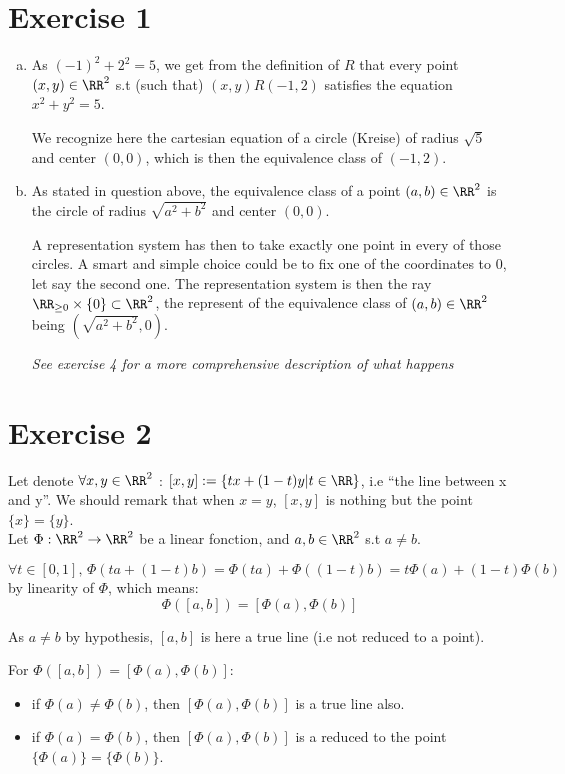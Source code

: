 \section{Exercise 1}

\begin{enumerate}[a)]
 \item As $(-1)^2+2^2=5$, we get from the definition of $R$ that every point $(x,y)\in\RR^2$ s.t (such that) $(x,y)R(-1,2)$ satisfies the equation $x^2+y^2=5$.
 
 We recognize here the cartesian equation of a circle (Kreise) of radius $\sqrt{5}$ and center $(0,0)$, which is then the equivalence class of $(-1,2)$.
 
 \item As stated in question above, the equivalence class of a point $(a,b)\in\RR^2$ is the circle of radius $\sqrt{a^2+b^2}$ and center $(0,0)$.
 
 A representation system has then to take exactly one point in every of those circles. A smart and simple choice could be to fix one of the coordinates to 0, let say the second one. The representation system is then the ray $\RR_{\geq 0}\times \{0\}\subset \RR^2$, the represent of the equivalence class of $(a,b)\in\RR^2$ being $(\sqrt{a^2+b^2}, 0)$.
 
 \textit{See exercise 4 for a more comprehensive description of what happens}
\end{enumerate}


\section{Exercise 2}

Let denote $\forall x,y\in\RR^2$ : $[x,y]:=\{tx+(1-t)y|t\in\RR\}$, i.e ``the line between x and y''.
We should remark that when $x=y$, $[x,y]$ is nothing but the point $\{x\}=\{y\}$.\\

Let $\Phi:\RR^2\to\RR^2$ be a linear fonction, and $a, b\in\RR^2$ s.t $a\neq b$.

$\forall t\in [0,1],\, \Phi(ta+(1-t)b)=\Phi(ta)+\Phi((1-t)b)=t\Phi(a)+(1-t)\Phi(b)$ by linearity of $\Phi$, which means:
$$
 \Phi([a,b])=[\Phi(a),\Phi(b)]
$$

As $a\neq b$ by hypothesis, $[a,b]$ is here a true line (i.e not reduced to a point).

For $\Phi([a,b])=[\Phi(a),\Phi(b)]$:

\begin{itemize}
 \item if $\Phi(a)\neq\Phi(b)$, then $[\Phi(a),\Phi(b)]$ is a true line also.
 \item if $\Phi(a)=\Phi(b)$, then $[\Phi(a), \Phi(b)]$ is a reduced to the point $\{\Phi(a)\}=\{\Phi(b)\}$.
\end{itemize}
